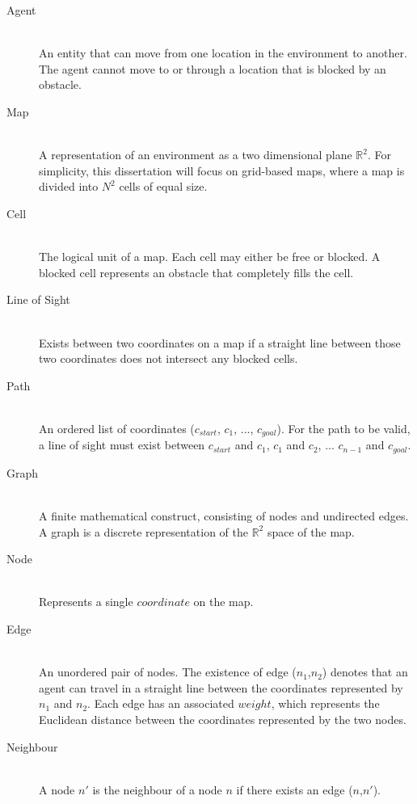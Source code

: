 \documentclass[12pt,twoside,notitlepage]{report}
\begin{document}
\begin{description}
\item[Agent] \hfill \\
  An entity that can move from one location in the environment to another. The agent cannot move to or through a location that is blocked by an obstacle.
  \item[Map] \hfill \\
  A representation of an environment as a two dimensional plane {$\mathbb{R}^{2}$}. For simplicity, this dissertation will focus on grid-based maps, where a map is divided into {$N^{2}$} cells of equal size. 
    \item[Cell] \hfill \\
  The logical unit of a map. Each cell may either be free or blocked. A blocked cell represents an obstacle that completely fills the cell.
  \item[Line of Sight] \hfill \\
  Exists between two coordinates on a map if a straight line between those two coordinates does not intersect any blocked cells.
   \item[Path] \hfill \\
  An ordered list of coordinates ({$c_{start}$}, {$c_{1}$}, ..., {$c_{goal}$}). For the path to be valid, a line of sight must exist between {$c_{start}$} and {$c_{1}$}, {$c_{1}$} and {$c_{2}$}, ... {$c_{n-1}$} and {$c_{goal}$}.
  \item[Graph] \hfill \\
  A finite mathematical construct, consisting of nodes and undirected edges. A graph is a discrete representation of the {$\mathbb{R}^{2}$} space of the map.
  \item[Node] \hfill \\
  Represents a single $coordinate$ on the map.
  \item[Edge] \hfill \\
  An unordered pair of nodes. The existence of edge ({$n_{1}$},{$n_{2}$}) denotes that an agent can travel in a straight line between the coordinates represented by {$n_{1}$} and {$n_{2}$}. Each edge has an associated $weight$, which represents the Euclidean distance between the coordinates represented by the two nodes.
    \item[Neighbour] \hfill \\
    A node {$n'$} is the neighbour of a node {$n$} if there exists an edge ({$n$},{$n'$}).
  
\end{description}
\end{document}
